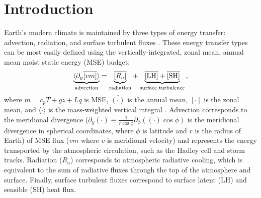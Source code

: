 \documentclass{ametsocV5}
\begin{document}




\section{Introduction}
Earth's modern climate is maintained by three types of energy transfer: advection, radiation, and surface turbulent fluxes \citep[e.g., see Ch.~6.2 in][]{hartmann2016}. These energy transfer types can be most easily defined using the vertically-integrated, zonal mean, annual mean moist static energy (MSE) budget:
\begin{equation} \label{eq:mse-ann}
    {\underbrace{ \langle\partial_y \overline{[vm]}\rangle}_{\text{advection}}} = {\underbrace{\vphantom{\partial_y \langle [vm]\rangle} \overline{[R_{a}]}}_\text{radiation}} + {\underbrace{\vphantom{\partial_y \langle [vm]\rangle} \mathrm{\overline{[LH]}+\overline{[SH]}}}_\text{surface turbulence}} \, ,
\end{equation}
where $m=c_p T + gz + Lq$ is MSE, $\overline{(\cdot)}$ is the annual mean, $[\cdot]$ is the zonal mean, and $\langle \cdot \rangle$ is the mass-weighted vertical integral \citep{neelin1987}. Advection corresponds to the meridional divergence ($\partial_y(\cdot)\equiv \frac{1}{r\cos{\phi}}\partial_\phi\left((\cdot)\cos{\phi}\right)$ is the meridional divergence in spherical coordinates, where $\phi$ is latitude and $r$ is the radius of Earth) of MSE flux ($vm$ where $v$ is meridional velocity) and represents the energy transported by the atmospheric circulation, such as the Hadley cell and storm tracks. Radiation ($R_a$) corresponds to atmospheric radiative cooling, which is equivalent to the sum of radiative fluxes through the top of the atmosphere and surface. Finally, surface turbulent fluxes correspond to surface latent ($\mathrm{LH}$) and sensible ($\mathrm{SH}$) heat flux.
\end{document}
